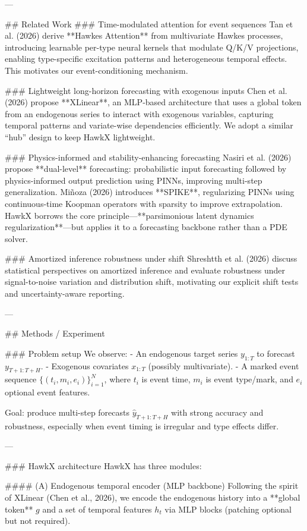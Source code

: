 ---

## Related Work  
### Time-modulated attention for event sequences  
Tan et al. (2026) derive **Hawkes Attention** from multivariate Hawkes processes, introducing learnable per-type neural kernels that modulate Q/K/V projections, enabling type-specific excitation patterns and heterogeneous temporal effects. This motivates our event-conditioning mechanism.

### Lightweight long-horizon forecasting with exogenous inputs  
Chen et al. (2026) propose **XLinear**, an MLP-based architecture that uses a global token from an endogenous series to interact with exogenous variables, capturing temporal patterns and variate-wise dependencies efficiently. We adopt a similar “hub” design to keep HawkX lightweight.

### Physics-informed and stability-enhancing forecasting  
Nasiri et al. (2026) propose **dual-level** forecasting: probabilistic input forecasting followed by physics-informed output prediction using PINNs, improving multi-step generalization. Miñoza (2026) introduces **SPIKE**, regularizing PINNs using continuous-time Koopman operators with sparsity to improve extrapolation. HawkX borrows the core principle—**parsimonious latent dynamics regularization**—but applies it to a forecasting backbone rather than a PDE solver.

### Amortized inference robustness under shift  
Shreshtth et al. (2026) discuss statistical perspectives on amortized inference and evaluate robustness under signal-to-noise variation and distribution shift, motivating our explicit shift tests and uncertainty-aware reporting.

---

## Methods / Experiment  

### Problem setup  
We observe:
- An endogenous target series \(y_{1:T}\) to forecast \(y_{T+1:T+H}\).
- Exogenous covariates \(x_{1:T}\) (possibly multivariate).
- A marked event sequence \(\{(t_i, m_i, e_i)\}_{i=1}^N\), where \(t_i\) is event time, \(m_i\) is event type/mark, and \(e_i\) optional event features.

Goal: produce multi-step forecasts \(\hat{y}_{T+1:T+H}\) with strong accuracy and robustness, especially when event timing is irregular and type effects differ.

---

### HawkX architecture  
HawkX has three modules:

#### (A) Endogenous temporal encoder (MLP backbone)  
Following the spirit of XLinear (Chen et al., 2026), we encode the endogenous history into a **global token** \(g\) and a set of temporal features \(h_t\) via MLP blocks (patching optional but not required).

